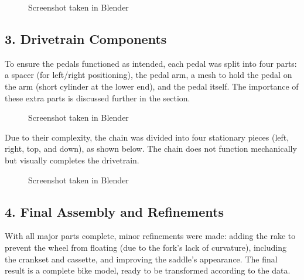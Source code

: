 \documentclass[letterpaper,10pt,english]{jupyterBook}
\begin{document}
\begin{figure}[htbp]
\centering
\capstart

\noindent{}
\caption{Screenshot taken in Blender}\label{\detokenize{Making the Model:wheel}}\end{figure}


\subsection{3. Drivetrain Components}
\label{\detokenize{Making the Model:drivetrain-components}}
\sphinxAtStartPar
To ensure the pedals functioned as intended, each pedal was split into four parts: a spacer (for left/right positioning), the pedal arm, a mesh to hold the pedal on the arm (short cylinder at the lower end), and the pedal itself. The importance of these extra parts is discussed further in the {\hyperref[\detokenize{Setting the Rig::doc}]{}} section.

\begin{figure}[htbp]
\centering
\capstart

\noindent{}
\caption{Screenshot taken in Blender}\label{\detokenize{Making the Model:pedal}}\end{figure}

\sphinxAtStartPar
Due to their complexity, the chain was divided into four stationary pieces (left, right, top, and down), as shown below. The chain does not function mechanically but visually completes the drivetrain.

\begin{figure}[htbp]
\centering
\capstart

\noindent{}
\caption{Screenshot taken in Blender}\label{\detokenize{Making the Model:chain}}\end{figure}


\subsection{4. Final Assembly and Refinements}
\label{\detokenize{Making the Model:final-assembly-and-refinements}}
\sphinxAtStartPar
With all major parts complete, minor refinements were made: adding the rake to prevent the wheel from floating (due to the fork’s lack of curvature), including the crankset and cassette, and improving the saddle’s appearance. The final result is a complete bike model, ready to be transformed according to the data.
\end{document}
